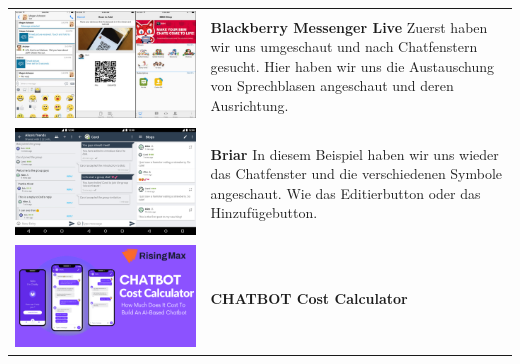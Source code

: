     \begin{tabular}{C{6cm}  L{7cm}}
        \includegraphics[width=\linewidth]{bilder/research pic/blackberry-messenger-live-free.png} & \textbf{Blackberry Messenger Live} \newline 
        Zuerst haben wir uns umgeschaut und nach Chatfenstern gesucht. Hier haben wir uns die Austauschung von Sprechblasen angeschaut
        und deren Ausrichtung. \\
        \includegraphics[width=\linewidth]{bilder/research pic/briar.jpg} & \textbf{Briar} \newline 
        In diesem Beispiel haben wir uns wieder das Chatfenster und die verschiedenen Symbole angeschaut.
        Wie das Editierbutton oder das Hinzufügebutton. \\
        \includegraphics[width=\linewidth]{bilder/research pic/chatbot-cost-calculator.png} & \textbf{CHATBOT Cost Calculator} \newline 

\end{tabular}
